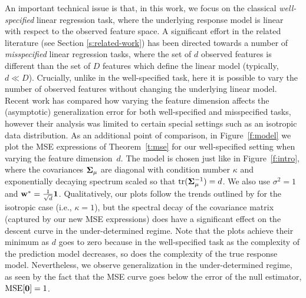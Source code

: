 \documentclass[11pt]{article}
\begin{document}
An important technical issue is that, in this work, we focus on the classical \emph{well-specified}
linear regression task, where the underlying response model is linear
with respect to the observed feature space. A significant effort in
the related literature (see Section \ref{s:related-work}) has been
directed towards a number of \emph{misspecified} linear regression
tasks, where the set of $d$ observed features is different than the
set of $D$ features which define the linear model (typically, $d\ll
D$). Crucially, unlike in the well-specified task, here it is possible
to vary the number of observed features without changing the
underlying linear model.
Recent work \citep{HMRT19_TR} has compared how
varying the feature dimension affects the (asymptotic) generalization
error for both well-specified and misspecified tasks, however their
analysis was limited to certain special settings such as an
isotropic data distribution. As an additional
point of comparison, in Figure~\ref{f:model} we plot the MSE
expressions of Theorem~\ref{t:mse} for our well-specified setting when varying the
feature dimension~$d$. The model is chosen just like in
Figure~\ref{f:intro}, where the covariances $\mathbf{\Sigma}_\mu$ are diagonal
with condition number $\kappa$ and exponentially decaying spectrum
scaled so that $\mathrm{tr}(\mathbf{\Sigma}_\mu^{-1})=d$. We also use $\sigma^2=1$ and
$\mathbf w^*=\frac1{\sqrt{d}}\mathbf 1$. Qualitatively, our plots follow the
trends outlined by \cite{HMRT19_TR} for the isotropic case (i.e., $\kappa=1$),
but the spectral decay of the covariance matrix (captured by our new
MSE expressions) does have a significant effect on the descent curve
in the under-determined regime. Note that the plots achieve their
minimum as $d$ goes to zero because in the well-specified task as
the complexity of the prediction model decreases, so does the complexity of the
true response model. Nevertheless,
we observe generalization in the under-determined regime,
as seen by the fact that the MSE curve goes below the error of the
null estimator, $\mathrm{MSE}[\mathbf 0]=1$.
\end{document}
